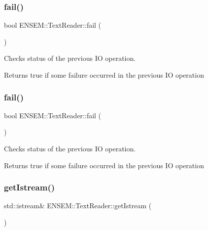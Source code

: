 \subsubsection{\texorpdfstring{fail()}{fail()}\hspace{0.1cm}{\footnotesize\ttfamily [2/3]}}
{\footnotesize\ttfamily bool E\+N\+S\+E\+M\+::\+Text\+Reader\+::fail (\begin{DoxyParamCaption}{ }\end{DoxyParamCaption})}



Checks status of the previous IO operation. 

\begin{DoxyReturn}{Returns}
true if some failure occurred in the previous IO operation 
\end{DoxyReturn}
\mbox{\label{classENSEM_1_1TextReader_ae21c25d2a62a1b242b09d745a314af69}} 
\subsubsection{\texorpdfstring{fail()}{fail()}\hspace{0.1cm}{\footnotesize\ttfamily [3/3]}}
{\footnotesize\ttfamily bool E\+N\+S\+E\+M\+::\+Text\+Reader\+::fail (\begin{DoxyParamCaption}{ }\end{DoxyParamCaption})}



Checks status of the previous IO operation. 

\begin{DoxyReturn}{Returns}
true if some failure occurred in the previous IO operation 
\end{DoxyReturn}
\mbox{\label{classENSEM_1_1TextReader_a855b7272df1bd50c18f730f3ac882428}} 
\subsubsection{\texorpdfstring{getIstream()}{getIstream()}\hspace{0.1cm}{\footnotesize\ttfamily [1/3]}}
{\footnotesize\ttfamily std\+::istream\& E\+N\+S\+E\+M\+::\+Text\+Reader\+::get\+Istream (\begin{DoxyParamCaption}{ }\end{DoxyParamCaption})\hspace{0.3cm}{\ttfamily [inline]}}



